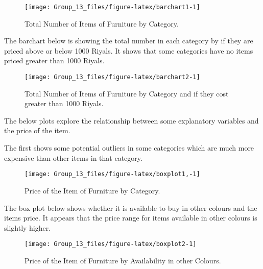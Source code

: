 \documentclass[
]{article}
\begin{document}
\begin{figure}[H]

{\centering \texttt{[image: Group\_13\_files/figure-latex/barchart1-1]} 

}

\caption{\label{fig:barchart1} Total Number of Items of Furniture by Category.}\label{fig:barchart1}
\end{figure}

The barchart below is showing the total number in each category by if
they are priced above or below 1000 Riyals. It shows that some
categories have no items priced greater than 1000 Riyals.

\begin{figure}[H]

{\centering \texttt{[image: Group\_13\_files/figure-latex/barchart2-1]} 

}

\caption{\label{fig:barchart2} Total Number of Items of Furniture by Category and if they cost greater than 1000 Riyals.}\label{fig:barchart2}
\end{figure}

The below plots explore the relationship between some explanatory
variables and the price of the item.

The first shows some potential outliers in some categories which are
much more expensive than other items in that category.

\begin{figure}[H]

{\centering \texttt{[image: Group\_13\_files/figure-latex/boxplot1,-1]} 

}

\caption{\label{fig:boxplot1} Price of the Item of Furniture by Category.}\label{fig:boxplot1,}
\end{figure}

The box plot below shows whether it is available to buy in other colours
and the items price. It appears that the price range for items available
in other colours is slightly higher.

\begin{figure}[H]

{\centering \texttt{[image: Group\_13\_files/figure-latex/boxplot2-1]} 

}

\caption{\label{fig:boxplot2} Price of the Item of Furniture by Availability in other Colours.}\label{fig:boxplot2}
\end{figure}
\end{document}
